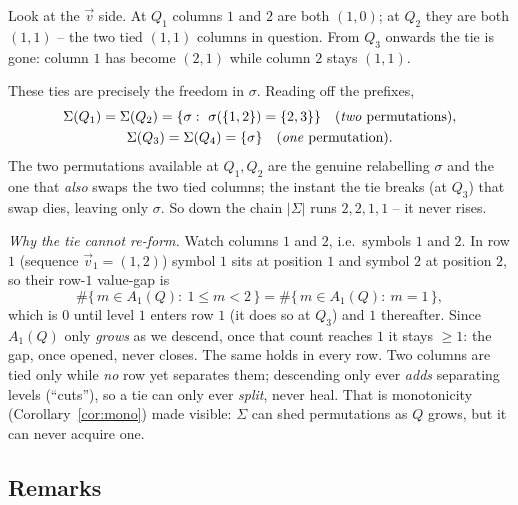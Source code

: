 \documentclass{article}
\begin{document}
Look at the $\vec v$ side.  At $Q_1$ columns $1$ and $2$ are both $(1,0)$; at $Q_2$
they are both $(1,1)$ -- the two tied $(1,1)$ columns in question.  From $Q_3$
onwards the tie is gone: column $1$ has become $(2,1)$ while column $2$ stays
$(1,1)$.

These ties are precisely the freedom in $\sigma$.  Reading off the prefixes,
\begin{gather*}
\Sigma(Q_1)=\Sigma(Q_2)=\{\sigma:\ \sigma(\{1,2\})=\{2,3\}\}\quad(\text{\emph{two}
permutations}),\\
\Sigma(Q_3)=\Sigma(Q_4)=\{\sigma\}\quad(\text{\emph{one} permutation}).
\end{gather*}
The two permutations available at $Q_1,Q_2$ are the genuine relabelling $\sigma$ and
the one that \emph{also} swaps the two tied columns; the instant the tie breaks (at
$Q_3$) that swap dies, leaving only $\sigma$.  So down the chain $|\Sigma|$ runs
$2,2,1,1$ -- it never rises.

\emph{Why the tie cannot re-form.}  Watch columns $1$ and $2$, i.e.\ symbols $1$ and
$2$.  In row $1$ (sequence $\vec v_1=(1,2)$) symbol $1$ sits at position $1$ and
symbol $2$ at position $2$, so their row-$1$ value-gap is
\[
\#\{\,m\in A_1(Q):\ 1\le m<2\,\}=\#\{\,m\in A_1(Q):\ m=1\,\},
\]
which is $0$ until level $1$ enters row $1$ (it does so at $Q_3$) and $1$ thereafter.
Since $A_1(Q)$ only \emph{grows} as we descend, once that count reaches $1$ it stays
$\ge1$: the gap, once opened, never closes.  The same holds in every row.  Two
columns are tied only while \emph{no} row yet separates them; descending only ever
\emph{adds} separating levels (``cuts''), so a tie can only ever \emph{split}, never
heal.  That is monotonicity (Corollary~\ref{cor:mono}) made visible: $\Sigma$ can
shed permutations as $Q$ grows, but it can never acquire one.

\subsection*{Remarks}
\end{document}
